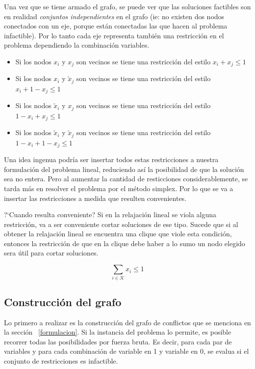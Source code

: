 Una vez que se tiene armado el grafo, se puede ver que las soluciones factibles son en realidad \emph{conjuntos independientes} en el grafo
(ie: no existen dos nodos conectados con un eje, porque est\'an conectadas las que hacen al problema infactible). Por lo tanto cada eje representa
tambi\'en una restricci\'on en el problema dependiendo la combinaci\'on variables.

\begin{itemize}
\item Si los nodos $x_i$ y $x_j$ son vecinos se tiene una restricci\'on del estilo $x_i +x_j \leq 1$
\item Si los nodos $x_i$ y $\tilde{x}_j$ son vecinos se tiene una restricci\'on del estilo $x_i + 1-x_j \leq 1$
\item Si los nodos $\tilde{x}_i$ y $x_j$ son vecinos se tiene una restricci\'on del estilo $1-x_i +x_j \leq 1$
\item Si los nodos $\tilde{x}_i$ y $\tilde{x}_j$ son vecinos se tiene una restricci\'on del estilo $1-x_i + 1-x_j \leq 1$
\end{itemize}

Una idea ingenua podr\'ia ser insertar todos estas restricciones a nuestra formulaci\'on del problema lineal, reduciendo as\'i la posibilidad de que la soluci\'on sea no entera.
Pero al aumentar la cantidad de resticciones considerablemente, se tarda m\'as en resolver el problema por el m\'etodo simplex. Por lo que se va
a insertar las restricciones a medida que resulten convenientes.

?`Cuando resulta conveniente? Si en la relajaci\'on lineal se viola alguna restricci\'on, va a ser conveniente cortar soluciones de ese tipo.
Sucede que si al obtener la relajaci\'on lineal se encuentra una clique que viole esta condici\'on, entonces
la restricci\'on de que en la clique debe haber a lo sumo un nodo elegido sera \'util para cortar soluciones.

\begin{equation} \label{eq3}
\sum\limits_{i \in \mathcal{K}} x_i \leq 1
\end{equation}

\bigskip
\subsection{Construcci\'on del grafo}

Lo primero a realizar es la construcci\'on del grafo de conflictos que se menciona en la secci\'on ~\ref{formulacion}.
Si la instancia del problema lo permite, es posible recorrer todas las posibilidades por fuerza bruta. Es decir, para cada par de variables y para cada 
combinaci\'on de variable en 1 y variable en 0, se evalua si el conjunto de restricciones es infactible.


